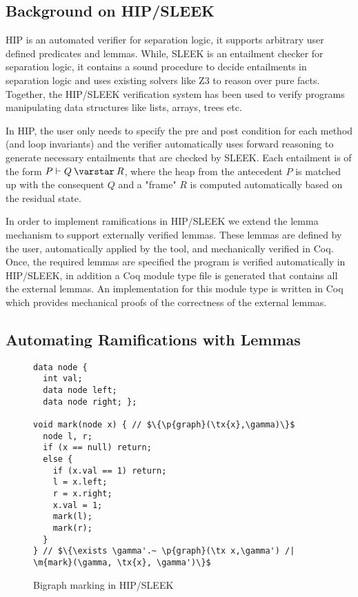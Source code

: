 \subsection{Background on HIP/SLEEK}
HIP is an automated verifier for separation logic, it supports arbitrary user defined predicates and lemmas. While, SLEEK
is an entailment checker for separation logic, it contains a sound  procedure to decide entailments in separation logic and uses existing solvers like Z3 to reason over pure facts. Together, the HIP/SLEEK verification system \cite{chin:hipsleek} has been used to verify programs manipulating data structures like lists, arrays, trees etc.

In HIP, the user only needs to specify the pre and post condition for each method (and loop invariants) and the verifier automatically uses forward reasoning to generate necessary entailments that are checked by SLEEK. Each entailment is of the form $P \vdash Q \scon R$, where the heap from the antecedent $P$ is matched up with the consequent $Q$ and a "frame" $R$ is computed automatically based on the residual state.

In order to implement ramifications in HIP/SLEEK we extend the lemma mechanism \cite{NguyenC08} to support externally verified lemmas. These lemmas are defined by the user, automatically applied by the tool, and mechanically verified in Coq. Once, the required lemmas are specified the program is verified automatically in HIP/SLEEK, in addition a Coq module type file is generated that contains all the external lemmas. An implementation for this module type is written in Coq which provides mechanical proofs of the correctness of the external lemmas.

\subsection{Automating Ramifications with Lemmas}

\begin{figure}[t]
  \begin{lstlisting}
data node {
  int val;
  data node left;
  data node right; };

void mark(node x) { // $\{\p{graph}(\tx{x},\gamma)\}$
  node l, r;
  if (x == null) return;
  else {
    if (x.val == 1) return;
    l = x.left;
    r = x.right;
    x.val = 1;
    mark(l);
    mark(r);
  }
} // $\{\exists \gamma'.~ \p{graph}(\tx x,\gamma') /| \m{mark}(\gamma, \tx{x}, \gamma')\}$
\end{lstlisting}
\caption{Bigraph marking in HIP/SLEEK}
\label{fig:hipmarkgraph}
\end{figure}

